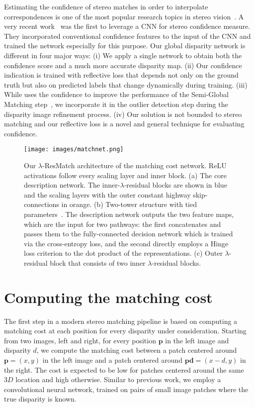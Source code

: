 \documentclass[10pt, twocolumn, letterpaper]{article}
\begin{document}
Estimating the confidence of stereo matches in order to interpolate correspondences is one of the most popular research topics in stereo vision~\cite{gherardi,gehrig,saygili,yoon}. A very recent work~\cite{Seki2016BMVC} was the first to leverage a CNN for stereo confidence measure. They incorporated conventional confidence features to the input of the CNN and trained the network especially for this purpose. Our global disparity network is different in four major ways: (i) We apply a single network to obtain both the confidence score and a much more accurate disparity map. (ii) Our confidence indication is trained with reflective loss that depends not only on the ground truth but also on predicted labels that change dynamically during training. (iii) While \cite{Seki2016BMVC} uses the confidence to improve the performance of the Semi-Global Matching step~\cite{hirschmuller}, we incorporate it in the outlier detection step during the disparity image refinement process. (iv) Our solution is not bounded to stereo matching and our reflective loss is a novel and general technique for evaluating confidence. 

\begin{figure*}[t]
\centering
\texttt{[image: images/matchnet.png]}
   \caption{Our $\lambda$-ResMatch architecture of the matching cost network. ReLU activations follow every scaling layer and inner block. (a) The core description network. The inner-$\lambda$-residual blocks are shown in blue and the scaling layers with the outer constant highway skip-connections in orange. (b) Two-tower structure with tied parameters~\cite{matchnet}. The description network outputs the two feature maps, which are the input for two pathways: the first concatenates and passes them to the fully-connected decision network which is trained via the cross-entropy loss, and the second directly employs a Hinge loss criterion to the dot product of the representations. (c) Outer $\lambda$-residual block that consists of two inner $\lambda$-residual blocks.}
\label{fig:matchnet}
\end{figure*}

\section{Computing the matching cost}
\label{sec:matching}
The first step in a modern stereo matching pipeline is based on computing a matching cost at each position for every disparity under consideration. Starting from two images, left and right, for every position $\mathbf{p}$ in the left image and disparity $d$, we compute the matching cost between a patch centered around $\mathbf{p} = (x,y)$ in the left image and a patch centered around $\mathbf{pd} = (x-d, y)$ in the right. The cost is expected to be low for patches centered around the same $3D$ location and high otherwise. Similar to previous work, we employ a convolutional neural network, trained on pairs of small image patches where the true disparity is known.
\end{document}
